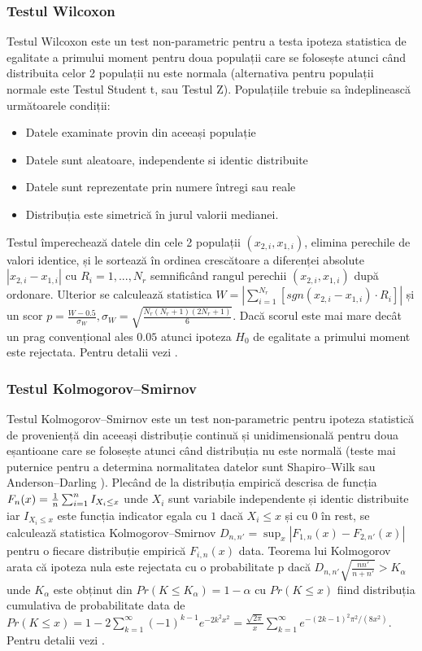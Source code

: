 \documentclass[11pt,draft]{article}
\begin{document}
\subsubsection{Testul Wilcoxon}
 Testul Wilcoxon este un test non-parametric pentru a testa ipoteza statistica de egalitate a primului moment pentru doua populații care se folosește atunci când distribuita celor 2 populații nu este normala (alternativa pentru populații normale este Testul Student t, sau Testul Z). 
 Populațiile trebuie sa îndeplinească următoarele condiții:
 \begin{itemize}
  \item Datele examinate provin din aceeași populație
  \item Datele sunt aleatoare, independente si identic distribuite
  \item Datele sunt reprezentate prin numere întregi sau reale
  \item Distribuția este simetrică în jurul valorii medianei.
 \end{itemize}
  Testul împerechează datele din cele 2 populații $(x_{2,i},x_{1,i})$, elimina perechile de valori identice, și le sortează în ordinea crescătoare a diferenței absolute $|x_{2,i}-x_{1,i}|$ cu $R_i=1, ..., N_r$ semnificând rangul perechii $(x_{2,i},x_{1,i})$ după ordonare. 
  Ulterior se calculează statistica $W = |\sum_{i=1}^{N_r} [sgn(x_{2,i} - x_{1,i}) \cdot R_i]| $ și un scor $p = \frac{W - 0.5}{\sigma_W}, \sigma_W = \sqrt{\frac{N_r(N_r + 1)(2N_r + 1)}{6}}$. 
  Dacă scorul este mai mare decât un prag convențional ales $0.05$ atunci ipoteza $H_0$ de egalitate a primului moment este rejectata. 
  Pentru detalii vezi \citep{wilcoxon45,siegel56}.

\subsubsection{Testul Kolmogorov–Smirnov}
 Testul Kolmogorov–Smirnov este un test non-parametric pentru ipoteza statistică de proveniență din aceeași distribuție continuă și unidimensională pentru doua eșantioane care se folosește atunci când distribuția nu este normală (teste mai puternice pentru a determina normalitatea datelor sunt  Shapiro–Wilk sau Anderson–Darling \citep{Stephens74} ). 
 Plecând de la distribuția empirică descrisa de funcția $F_n(x)={1 \over n}\sum_{i=1}^n I_{X_i\leq x}$ unde $X_i$ sunt variabile independente și identic distribuite iar $I_{X_i\leq x}$ este funcția indicator egala cu $1$ dacă $X_i\leq x$ și cu $0$ în rest, se calculează statistica Kolmogorov–Smirnov $D_{n,n'}=\sup_x |F_{1,n}(x)-F_{2,n'}(x)|$ pentru o fiecare distribuție empirică $F_{i,n}(x)$ data. 
 Teorema lui Kolmogorov arata că ipoteza nula este rejectata cu o probabilitate p dacă $D_{n,n'}\sqrt{\frac{n n'}{n + n'}}>K_\alpha$ unde $K_\alpha$ este obținut din $Pr(K\leq K_\alpha)=1-\alpha$ cu $Pr(K\leq x)$ fiind distribuția cumulativa de probabilitate data de $Pr(K\leq x)=1-2\sum_{k=1}^\infty (-1)^{k-1} e^{-2k^2 x^2}=\frac{\sqrt{2\pi}}{x}\sum_{k=1}^\infty e^{-(2k-1)^2\pi^2/(8x^2)}$. 
 Pentru detalii vezi \citep{stuart99}.
\end{document}
